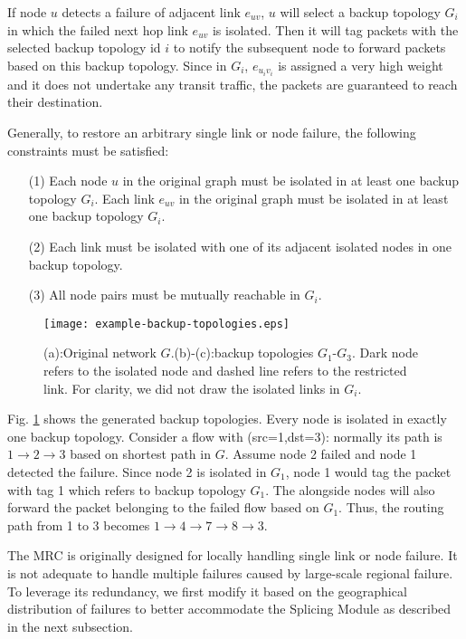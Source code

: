 \documentclass[10pt,journal]{IEEEtran}
\begin{document}
If node $u$ detects a failure of adjacent link $e_{uv}$, $u$ will select a backup topology $G_i$ in which the failed next hop link $e_{uv}$ is isolated. Then it will tag packets with the selected backup topology id $i$ to notify the subsequent node to forward packets based on this backup topology. Since in $G_i$,  $e_{u_{i}v_{i}}$ is assigned a very high weight and it does not undertake any transit traffic, the packets are guaranteed to reach their destination.

Generally, to restore an arbitrary single link or node failure, the following constraints must be satisfied:

\begin{enumerate}\item[(1)] Each node $u$ in the original graph must be isolated in at least one backup topology $G_i$. Each link $e_{uv}$ in the original graph must be isolated in at least one backup topology $G_i$.
\item[(2)] Each link must be isolated with one of its adjacent isolated nodes in one backup topology.
\item[(3)] All node pairs must be mutually reachable in $G_i$.
\end{enumerate}

\begin{figure}[!h]
\begin{center}
		\texttt{[image: example-backup-topologies.eps]}
	\caption{(a):Original network $G$.(b)-(c):backup topologies $G_1$-$G_3$. Dark node refers to the isolated node and dashed line refers to the restricted link. For clarity, we did not draw the isolated links in $G_i$.}
	\label{fig:example_backup_topologies}
\end{center}
\end{figure}

Fig. \ref{fig:example_backup_topologies} shows the generated backup topologies. Every node is isolated in exactly one backup topology. Consider a flow with (src=1,dst=3): normally its path is $1\rightarrow2\rightarrow3$ based on shortest path in $G$. Assume node 2 failed and node 1 detected the failure. Since node 2 is isolated in $G_1$, node 1 would tag the packet with tag 1 which refers to backup topology $G_1$. The alongside nodes will also forward the packet belonging to the failed flow based on $G_1$. Thus, the routing path from 1 to 3 becomes $1\rightarrow4\rightarrow7\rightarrow8\rightarrow3$.

The MRC is originally designed for locally handling single link or node failure. It is not adequate to handle multiple failures caused by large-scale regional failure. To leverage its redundancy, we first modify it based on the geographical distribution of failures to better accommodate the Splicing Module as described in the next subsection.
\end{document}
